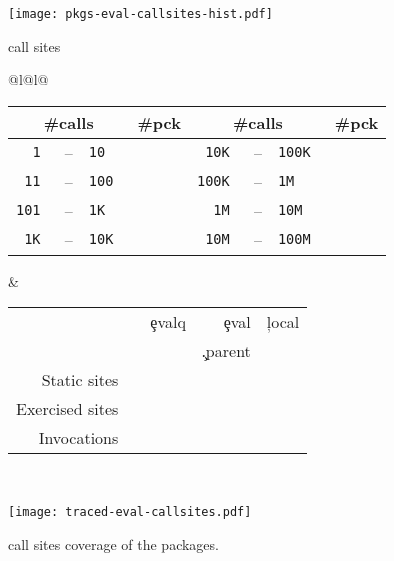 \documentclass[screen,acmsmall]{acmart}%
\begin{document}
\begin{figure}[!b]
\centering
  \texttt{[image: pkgs-eval-callsites-hist.pdf]}
  \caption{ \eval call sites}\label{fig:pkgs-eval-callsites-hist}

  \medskip

  \small
\begin{tabular}{@{}l@{\hspace{1.5cm}}l@{}}
\begin{minipage} {5cm}\small
  \begin{tabular}{|r@{\,}r@{\,}l@{}r|r@{\,}r@{\,}l@{}r|} \hline
    \multicolumn{3}{|c}{\small\#calls} &\small \#pck
&     \multicolumn{3}{c}{\small\#calls} &\small\#pck \\\hline
\tt 1 &--& \tt 10      & \packageBina  & \tt 10K &--&\tt 100K  & \packageBine\\
\tt 11 &--& \tt 100    & \packageBinb  & \tt 100K &--&\tt 1M  & \packageBinf\\
\tt 101 &--& \tt 1K    & \packageBinc  & \tt 1M &--&\tt 10M   & \packageBing\\
\tt 1K &--& \tt 10K    & \packageBind  & \tt 10M &--& \tt 100M & \packageBinh\\\hline
\end{tabular}
\caption{Call frequency}\label{freq}
\end{minipage}
&
\begin{minipage}{7cm}\small
\begin{tabular}{|@{\,}r|rrrr|}\hline
  &\eval & \c{evalq} & \c{eval} & \c{local}\\[-1.5mm]
           & & & \c{.parent} &\\\hline
\small Static sites &\packageStaticeval&\packageStaticevalq&\packageStaticevalparent&\packageStaticlocal \\
\small Exercised sites&\packageTriggeredeval&\packageTriggeredevalq&\packageTriggeredevalparent&\packageTriggeredlocal\\
\small Invocations&\packageEvalsRnd&\packageEvalqsRnd&\packageEparentsRnd&\packageLocalsRnd\\\hline
\end{tabular}~\\[2mm]\caption{Variants}\label{tab:variantseval}
\end{minipage}\end{tabular}

\medskip

\texttt{[image: traced-eval-callsites.pdf]} \centering
  \caption{\eval call sites coverage of the \PkgPackages packages.}%
  \label{fig:traced-eval-callsites}
\end{figure}
\end{document}
